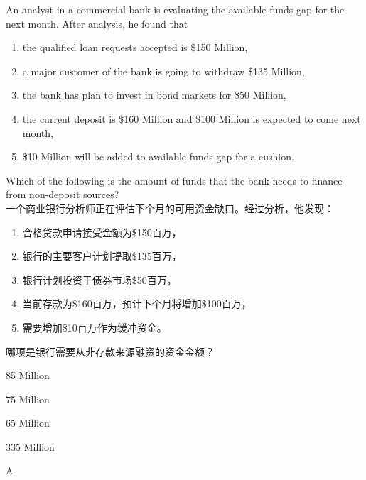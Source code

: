 \documentclass{article}
\newcounter{question} %
\begin{document}
\begin{question}
    An analyst in a commercial bank is evaluating the available funds gap for the next month. After analysis, he found that 
    \begin{enumerate}
        \item the qualified loan requests accepted is \$150 Million, 
        \item a major customer of the bank is going to withdraw \$135 Million, 
        \item the bank has plan to invest in bond markets for \$50 Million, 
        \item the current deposit is \$160 Million and \$100 Million is expected to come next month, 
        \item \$10 Million will be added to available funds gap for a cushion. 
    \end{enumerate}
    Which of the following is the amount of funds that the bank needs to finance from non-deposit sources?
    \\一个商业银行分析师正在评估下个月的可用资金缺口。经过分析，他发现：
    \begin{enumerate}
        \item 合格贷款申请接受金额为\$150百万，
        \item 银行的主要客户计划提取\$135百万，
        \item 银行计划投资于债券市场\$50百万，
        \item 当前存款为\$160百万，预计下个月将增加\$100百万，
        \item 需要增加\$10百万作为缓冲资金。
    \end{enumerate}
    哪项是银行需要从非存款来源融资的资金金额？
\end{question}

\begin{choices}
    \item 85 Million
    \item 75 Million
    \item 65 Million
    \item 335 Million
\end{choices}

\begin{correctanswer}
    A
\end{correctanswer}
\end{document}
